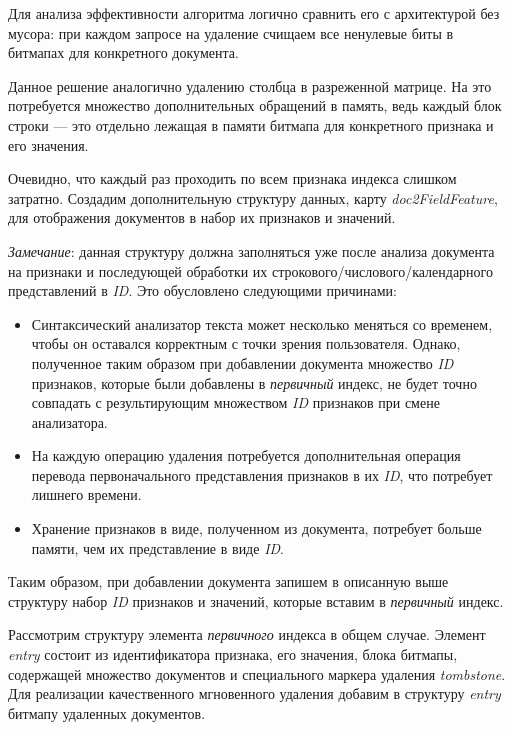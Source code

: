 Для анализа эффективности алгоритма логично сравнить его с архитектурой без мусора:
при каждом запросе на удаление счищаем все ненулевые биты в битмапах для конкретного
документа.

Данное решение аналогично удалению столбца в разреженной матрице. На это потребуется
множество дополнительных обращений в память, ведь каждый блок строки — это
отдельно лежащая в памяти битмапа для конкретного признака и его значения.

Очевидно, что каждый раз проходить по всем признака индекса слишком затратно. Создадим
дополнительную структуру данных, карту \textit{doc2FieldFeature}, для отображения
документов в набор их признаков и значений. 

\textit{Замечание}: данная структуру должна заполняться уже после анализа документа на
признаки и последующей обработки их строкового/числового/календарного
представлений в \textit{ID}. Это обусловлено следующими причинами:
\begin{itemize}
    \item Синтаксический анализатор текста может несколько меняться со временем,
    чтобы он оставался корректным с точки зрения пользователя. Однако,
    полученное таким образом при добавлении документа множество \textit{ID} признаков,
    которые были добавлены в \textit{первичный} индекс, не будет точно совпадать с
    результирующим множеством \textit{ID} признаков при смене анализатора.
    \item На каждую операцию удаления потребуется дополнительная операция перевода
    первоначального представления признаков в их \textit{ID}, что потребует лишнего
    времени.
    \item Хранение признаков в виде, полученном из документа, потребует больше
    памяти, чем их представление в виде \textit{ID}.
\end{itemize}

Таким образом, при добавлении документа запишем в описанную выше структуру набор
\textit{ID} признаков и значений, которые вставим в \textit{первичный} индекс.

Рассмотрим структуру элемента \textit{первичного} индекса в общем случае. Элемент
\textit{entry} состоит из идентификатора признака, его значения, блока битмапы,
содержащей множество документов и специального маркера удаления
\textit{tombstone}. Для реализации качественного мгновенного удаления добавим в
структуру \textit{entry} битмапу удаленных документов.

